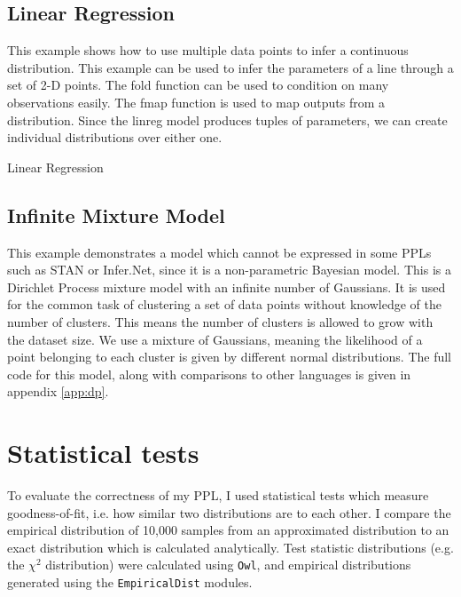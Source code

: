 \subsection{Linear Regression}
This example shows how to use multiple data points to infer a continuous distribution. This example can be used to infer the parameters of a line through a set of 2-D points. The fold function can be used to condition on many observations easily. The fmap function is used to map outputs from a distribution. Since the linreg model produces tuples of parameters, we can create individual distributions over either one.

\begin{listing}[!ht]
	\caption{Linear Regression}
	\label{lst:linreg}
\end{listing}

\subsection{Infinite Mixture Model}
This example demonstrates a model which cannot be expressed in some PPLs such as STAN or Infer.Net, since it is a non-parametric Bayesian model. This is a Dirichlet Process mixture model with an infinite number of Gaussians\cite{dpmm}. It is used for the common task of clustering a set of data points without knowledge of the number of clusters. This means the number of clusters is allowed to grow with the dataset size. We use a mixture of Gaussians, meaning the likelihood of a point belonging to each cluster is given by different normal distributions. The full code for this model, along with comparisons to other languages is given in appendix \ref{app:dp}.


\section{Statistical tests}
To evaluate the correctness of my PPL, I used statistical tests which measure goodness-of-fit, i.e. how similar two distributions are to each other. I compare the empirical distribution of 10,000 samples from an approximated distribution to an exact distribution which is calculated analytically. Test statistic distributions (e.g. the $\chi^2$ distribution) were calculated using \texttt{Owl}, and empirical distributions generated using the \texttt{EmpiricalDist} modules.


